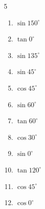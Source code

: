 \begin{multicols}{5}
\begin{enumerate}

  \item $\displaystyle \sin{150^\circ}$


  \item $\displaystyle \tan{0^\circ}$

        \phantom{$\displaystyle =0$}

\columnbreak %

  \item $\displaystyle \sin{135^\circ}$


  \item $\displaystyle \sin{45^\circ}$


  \item $\displaystyle \cos{45^\circ}$


  \item $\displaystyle \sin{60^\circ}$


  \item $\displaystyle \tan{60^\circ}$


  \item $\displaystyle \cos{30^\circ}$


  \item $\displaystyle \sin{0^\circ}$

        \phantom{$\displaystyle =0$}

  \item $\displaystyle \tan{120^\circ}$


  \item $\displaystyle \cos{45^\circ}$


  \item $\displaystyle \cos{0^\circ}$

        \phantom{$\displaystyle =1$}


\end{enumerate}
\end{multicols}
